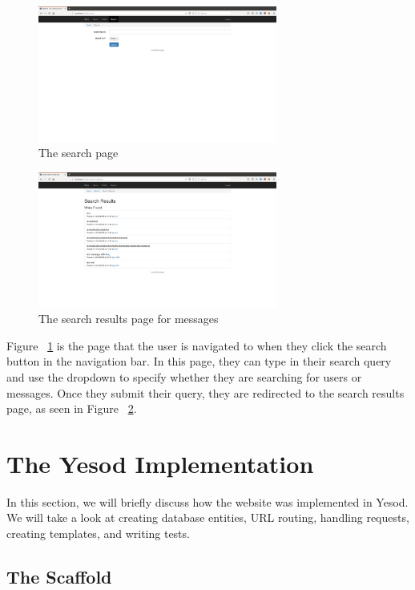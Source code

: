 \begin{figure}[H]
	\centering
	\includegraphics[width=0.7\textwidth]{final_report/pics/searchBase.png}
	\caption{The search page}
	\label{fig:wireSearch}
\end{figure}

\begin{figure}[H]
	\centering
	\includegraphics[width=0.7\textwidth]{final_report/pics/searchWire.png}
	\caption{The search results page for messages}
	\label{fig:wireSearchWire}
\end{figure}

Figure ~\ref{fig:wireSearch} is the page that the user is navigated to when they
click the search button in the navigation bar. In this page, they can type in
their search query and use the dropdown to specify whether they are searching
for users or messages. Once they submit their query, they are redirected to
the search results page, as seen in Figure ~\ref{fig:wireSearchWire}.

\section{The Yesod Implementation}

In this section, we will briefly discuss how the website was implemented in Yesod.
We will take a look at creating database entities, URL routing, handling requests,
creating templates, and writing tests.

\subsection{The Scaffold}

